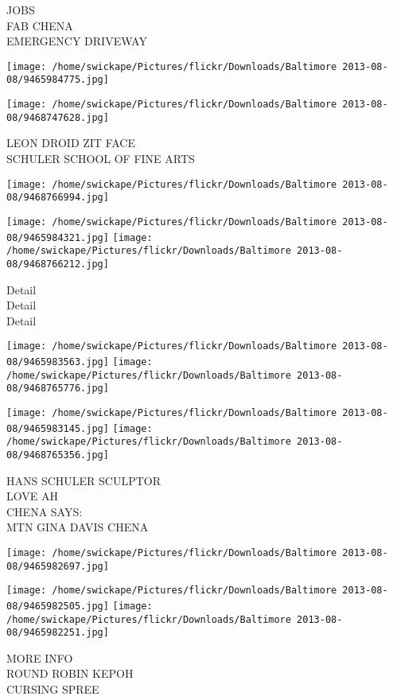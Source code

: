 \documentclass[10pt,letterpaper]{article}
\begin{document}
JOBS\\
FAB CHENA\\
EMERGENCY DRIVEWAY
\pagebreak

\texttt{[image: /home/swickape/Pictures/flickr/Downloads/Baltimore 2013-08-08/9465984775.jpg]}

\vspace{0.25in}
\texttt{[image: /home/swickape/Pictures/flickr/Downloads/Baltimore 2013-08-08/9468747628.jpg]}

LEON DROID ZIT FACE\\
SCHULER SCHOOL OF FINE ARTS
\pagebreak

\texttt{[image: /home/swickape/Pictures/flickr/Downloads/Baltimore 2013-08-08/9468766994.jpg]}

\vspace{0.25in}
\texttt{[image: /home/swickape/Pictures/flickr/Downloads/Baltimore 2013-08-08/9465984321.jpg]}
\texttt{[image: /home/swickape/Pictures/flickr/Downloads/Baltimore 2013-08-08/9468766212.jpg]}

Detail\\
Detail\\
Detail
\pagebreak

\texttt{[image: /home/swickape/Pictures/flickr/Downloads/Baltimore 2013-08-08/9465983563.jpg]}
\texttt{[image: /home/swickape/Pictures/flickr/Downloads/Baltimore 2013-08-08/9468765776.jpg]}

\texttt{[image: /home/swickape/Pictures/flickr/Downloads/Baltimore 2013-08-08/9465983145.jpg]}
\texttt{[image: /home/swickape/Pictures/flickr/Downloads/Baltimore 2013-08-08/9468765356.jpg]}

HANS SCHULER SCULPTOR\\
LOVE AH\\
CHENA SAYS:\\
MTN GINA DAVIS CHENA
\pagebreak

\texttt{[image: /home/swickape/Pictures/flickr/Downloads/Baltimore 2013-08-08/9465982697.jpg]}

\vspace{0.25in}
\texttt{[image: /home/swickape/Pictures/flickr/Downloads/Baltimore 2013-08-08/9465982505.jpg]}
\texttt{[image: /home/swickape/Pictures/flickr/Downloads/Baltimore 2013-08-08/9465982251.jpg]}

MORE INFO\\
ROUND ROBIN KEPOH\\
CURSING SPREE
\pagebreak
\end{document}
